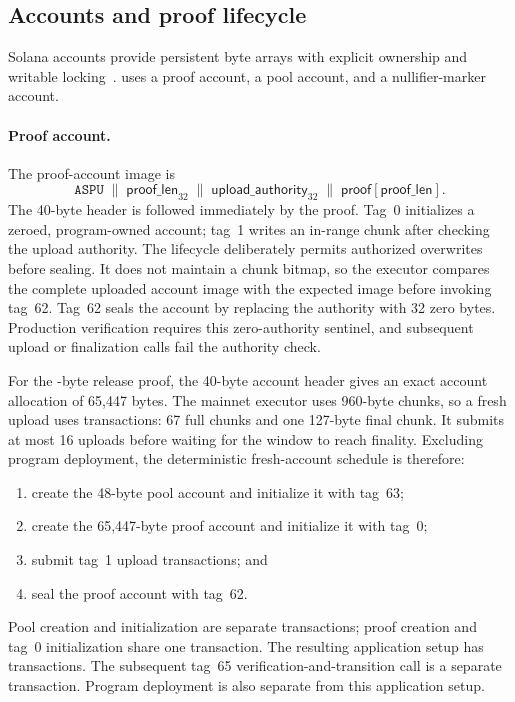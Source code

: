 \subsection{Accounts and proof lifecycle}
\label{sec:implementation-accounts}

Solana accounts provide persistent byte arrays with explicit ownership and
writable locking~\cite{SolanaAccounts,SolanaTransactions}.  \Profile{} uses a
proof account, a pool account, and a nullifier-marker account.

\paragraph{Proof account.}
The proof-account image is
\[
  \mathtt{ASPU}\;\mathbin\|\;
  \mathsf{proof\_len}_{32}\;\mathbin\|\;
  \mathsf{upload\_authority}_{32}\;\mathbin\|\;
  \mathsf{proof}[\mathsf{proof\_len}].
\]
The 40-byte header is followed immediately by the proof.  Tag~0 initializes a
zeroed, program-owned account; tag~1 writes an in-range chunk after checking
the upload authority.  The lifecycle deliberately permits authorized
overwrites before sealing.  It does not maintain a chunk bitmap, so the
executor compares the complete uploaded account image with the expected image
before invoking tag~62.  Tag~62 seals the account by replacing the authority
with 32 zero bytes.  Production verification requires this zero-authority
sentinel, and subsequent upload or finalization calls fail the authority
check.

For the \ProfileProofBytes-byte release proof, the 40-byte account header gives
an exact account allocation of 65,447 bytes.  The mainnet executor uses
960-byte chunks, so a fresh upload
uses \ProfileUploadTransactions{} transactions: 67 full chunks and one
127-byte final chunk.  It submits at most 16 uploads before waiting for the
window to reach finality.  Excluding program deployment, the deterministic
fresh-account schedule is therefore:
\begin{enumerate}
  \item create the 48-byte pool account and initialize it with tag~63;
  \item create the 65,447-byte proof account and initialize it with tag~0;
  \item submit \ProfileUploadTransactions{} tag~1 upload transactions; and
  \item seal the proof account with tag~62.
\end{enumerate}
Pool creation and initialization are separate transactions; proof creation
and tag~0 initialization share one transaction.  The resulting application
setup has \ProfileMainnetSetupTransactions{} transactions.  The subsequent
tag~65 verification-and-transition call is a separate transaction.  Program
deployment is also separate from this application setup.

